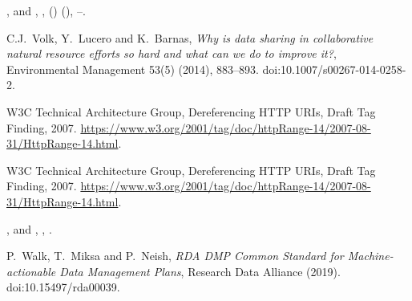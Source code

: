 \documentclass[ds,v1.1.2,openaccess]{iosart2x}%
\begin{document}
\begin{thebibliography}{}
%
\begin{barticle}
,
 and
,
,
()
(),
--.
\end{barticle}
%
\OrigBibText
C.J.~Volk,
Y.~Lucero and
K.~Barnas,
\textit{Why is data sharing in collaborative natural resource efforts
so hard
and what can we do to improve it?},
Environmental Management
53(5)
(2014),
883--893.
doi:10.1007/s00267-014-0258-2.
\endOrigBibText
{}
\endbibitem

%
\begin{botherref}
{W3C Technical Architecture Group}, Dereferencing {HTTP}
{URIs}, Draft Tag Finding,
2007.
\url{https://www.w3.org/2001/tag/doc/httpRange-14/2007-08-31/HttpRange-14.html}.
\end{botherref}
%
\OrigBibText
{W3C Technical Architecture Group},
Dereferencing {HTTP} {URIs},
Draft Tag Finding,
2007.
\url{https://www.w3.org/2001/tag/doc/httpRange-14/2007-08-31/HttpRange-14.html}.
\endOrigBibText
{}
\endbibitem

%
\begin{bbook}
,
 and
,
,
.
\end{bbook}
%
\OrigBibText
P.~Walk,
T.~Miksa and
P.~Neish,
\textit{{RDA} {DMP} Common Standard for Machine-actionable Data Management
Plans},
Research Data Alliance
(2019).
doi:10.15497/rda00039.
\endOrigBibText
{}
\endbibitem


\end{thebibliography}
\end{document}
